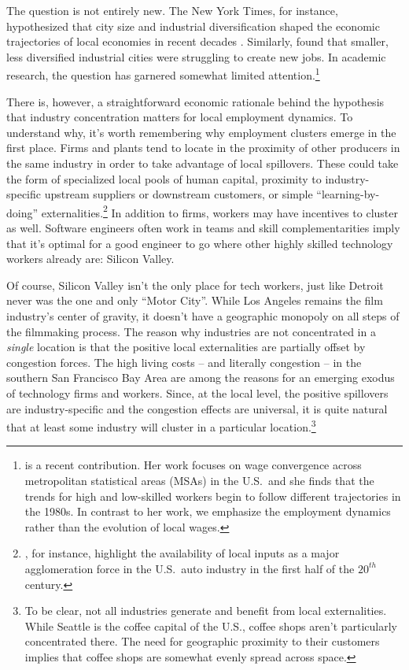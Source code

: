 \documentclass[onehalfspacing,11pt]{article}
\begin{document}
The question is not entirely new. The New York Times, for instance, hypothesized that city size and industrial diversification shaped the economic trajectories of local economies in recent decades \citep{Porter:2017,Porter:2018}. Similarly, \cite{Berube:2018} found that smaller, less diversified industrial cities were struggling to create new jobs. In academic research, the question has garnered somewhat limited attention.\footnote{\cite{Giannone:2019} is a recent contribution. Her work focuses on wage convergence across metropolitan statistical areas (MSAs) in the U.S.~and she finds that the trends for high and low-skilled workers begin to follow different trajectories in the 1980s. In contrast to her work, we emphasize the employment dynamics rather than the evolution of local wages.}%

There is, however, a straightforward economic rationale behind the hypothesis that industry concentration matters for local employment dynamics. To understand why, it's worth remembering why employment clusters emerge in the first place. Firms and plants tend to locate in the proximity of other producers in the same industry in order to take advantage of local spillovers. These could take the form of specialized local pools of human capital, proximity to industry-specific upstream suppliers or downstream customers, or simple ``learning-by-doing'' externalities.\footnote{\cite{Cabral:2018}, for instance, highlight the availability of local inputs as a major agglomeration force in the U.S.~auto industry in the first half of the $20^{th}$ century.} In addition to firms, workers may have incentives to cluster as well. Software engineers often work in teams and skill complementarities imply that it's optimal for a good engineer to go where other highly skilled technology workers already are: Silicon Valley.

Of course, Silicon Valley isn't the only place for tech workers, just like Detroit never was the one and only ``Motor City''. While Los Angeles remains the film industry's center of gravity, it doesn't have a geographic monopoly on all steps of the filmmaking process. The reason why industries are not concentrated in a {\it single} location is that the positive local externalities are partially offset by congestion forces. The high living costs -- and literally congestion -- in the southern San Francisco Bay Area are among the reasons for an emerging exodus of technology firms and workers. Since, at the local level, the positive spillovers are industry-specific and the congestion effects are universal, it is quite natural that at least some industry will cluster in a particular location.\footnote{To be clear, not all industries generate and benefit from local externalities. While Seattle is the coffee capital of the U.S., coffee shops aren't particularly concentrated there. The need for geographic proximity to their customers implies that coffee shops are somewhat evenly spread across space.}
\end{document}
